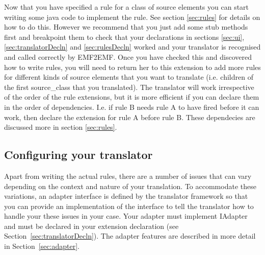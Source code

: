 	Now that you have specified a rule for a class of source elements you can start writing some java code to implement the rule. See section \ref{sec:rules} for details on how to do this. However we recommend that you just add some stub methods first and breakpoint them to check that your declarations in sections \ref{sec:ui}, \ref{sec:translatorDecln} and \ref{sec:rulesDecln} worked and your translator is recognised and called correctly by EMF2EMF. Once you have checked this and discovered how to write rules, you will need to return her to this extension to add more rules for different kinds of source elements that you want to translate (i.e. children of the first source\_class that you translated). The translator will work irrespective of the order of the rule extensions, but it is more efficient if you can declare them in the order of dependencies. I.e. if rule B needs rule A to have fired before it can work, then declare the extension for rule A before rule B. These dependecies are discussed more in section \ref{sec:rules}. 

\subsection{Configuring your translator}
\label{sec:configure}

Apart from writing the actual rules, there are a number of issues that can vary depending on the context and nature of your translation.
To accommodate these variations, an adapter interface is defined by the translator framework so that you can provide an implementation of the interface to tell the translator how to handle your these issues in your case.
Your adapter must implement IAdapter and must be declared in your extension declaration (see Section~\ref{sec:translatorDecln}).
The adapter features are described in more detail in Section~\ref{sec:adapter}.


